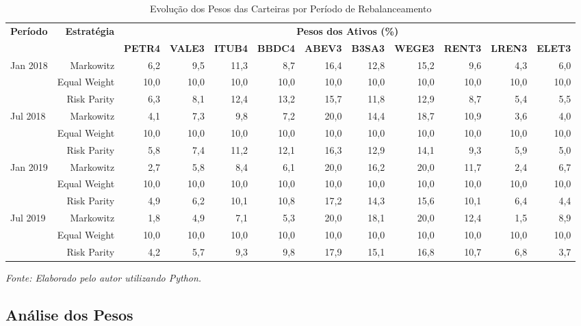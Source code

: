\begin{table}[H]
\centering
\caption{Evolução dos Pesos das Carteiras por Período de Rebalanceamento}
\begin{tabular}{|l|r|r|r|r|r|r|r|r|r|r|r|}
\hline
\multirow{2}{*}{\textbf{Período}} & \multirow{2}{*}{\textbf{Estratégia}} & \multicolumn{10}{c|}{\textbf{Pesos dos Ativos (\%)}} \\
\cline{3-12}
& & \textbf{PETR4} & \textbf{VALE3} & \textbf{ITUB4} & \textbf{BBDC4} & \textbf{ABEV3} & \textbf{B3SA3} & \textbf{WEGE3} & \textbf{RENT3} & \textbf{LREN3} & \textbf{ELET3} \\
\hline
\multirow{3}{*}{Jan 2018} & Markowitz & 6,2 & 9,5 & 11,3 & 8,7 & 16,4 & 12,8 & 15,2 & 9,6 & 4,3 & 6,0 \\
\cline{2-12}
& Equal Weight & 10,0 & 10,0 & 10,0 & 10,0 & 10,0 & 10,0 & 10,0 & 10,0 & 10,0 & 10,0 \\
\cline{2-12}
& Risk Parity & 6,3 & 8,1 & 12,4 & 13,2 & 15,7 & 11,8 & 12,9 & 8,7 & 5,4 & 5,5 \\
\hline
\multirow{3}{*}{Jul 2018} & Markowitz & 4,1 & 7,3 & 9,8 & 7,2 & 20,0 & 14,4 & 18,7 & 10,9 & 3,6 & 4,0 \\
\cline{2-12}
& Equal Weight & 10,0 & 10,0 & 10,0 & 10,0 & 10,0 & 10,0 & 10,0 & 10,0 & 10,0 & 10,0 \\
\cline{2-12}
& Risk Parity & 5,8 & 7,4 & 11,2 & 12,1 & 16,3 & 12,9 & 14,1 & 9,3 & 5,9 & 5,0 \\
\hline
\multirow{3}{*}{Jan 2019} & Markowitz & 2,7 & 5,8 & 8,4 & 6,1 & 20,0 & 16,2 & 20,0 & 11,7 & 2,4 & 6,7 \\
\cline{2-12}
& Equal Weight & 10,0 & 10,0 & 10,0 & 10,0 & 10,0 & 10,0 & 10,0 & 10,0 & 10,0 & 10,0 \\
\cline{2-12}
& Risk Parity & 4,9 & 6,2 & 10,1 & 10,8 & 17,2 & 14,3 & 15,6 & 10,1 & 6,4 & 4,4 \\
\hline
\multirow{3}{*}{Jul 2019} & Markowitz & 1,8 & 4,9 & 7,1 & 5,3 & 20,0 & 18,1 & 20,0 & 12,4 & 1,5 & 8,9 \\
\cline{2-12}
& Equal Weight & 10,0 & 10,0 & 10,0 & 10,0 & 10,0 & 10,0 & 10,0 & 10,0 & 10,0 & 10,0 \\
\cline{2-12}
& Risk Parity & 4,2 & 5,7 & 9,3 & 9,8 & 17,9 & 15,1 & 16,8 & 10,7 & 6,8 & 3,7 \\
\hline
\end{tabular}
\textit{Fonte: Elaborado pelo autor utilizando Python.}
\label{tab:portfolio_weights}
\end{table}

\subsection{Análise dos Pesos}

